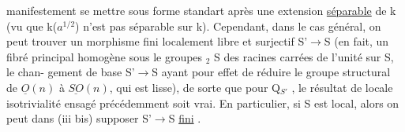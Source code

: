 
manifestement se mettre sous forme standart après une extension \uline{séparable}
de k (vu que k($a^{1/2}$) n'est pas séparable sur k). Cependant, dans le cas
 général, on peut trouver un morphisme fini  localement
libre et surjectif S'$\to$S (en fait, un fibré principal homogène sous
le  groupes \hand{$\mu$}$_{2}$ S  \hand{(}des racines carrées\hand{)} de l'unité sur S,\hand{--} le chan-%
gement de base S'$\to$S ayant pour effet de réduire le groupe structural de
$\underline{O}(n)$ à $\underline{SO}(n)$, qui est lisse), de sorte que pour Q$_{S'}$ , le résultat de
locale isotrivialité ensagé précédemment soit vrai. En particulier, si
S est local, alors on peut dans (iii bis) supposer S'$\to$S \uline{fini} .

